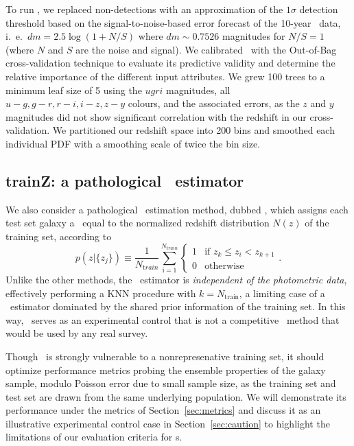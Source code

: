 To run \tpz, we replaced non-detections with an approximation of the $1\sigma$ detection threshold based on the signal-to-noise-based error forecast of the 10-year \lsst\ data, i.~e.~$dm = 2.5 \log (1 + N/S)$ where $dm \sim 0.7526$ magnitudes for $N/S = 1$ (where $N$ and $S$ are the noise and signal).
We calibrated \tpz\ with the Out-of-Bag cross-validation technique \citep{Breiman:84,Carrasco_Kind:13} to evaluate its predictive validity and determine the relative importance of the different input attributes.
We grew 100 trees to a minimum leaf size of 5 using the $ugri$ magnitudes, all $u-g, g-r, r-i, i-z, z-y$ colours, and the associated errors, as the $z$ and $y$ magnitudes did not show significant correlation with the redshift in our cross-validation.
We partitioned our redshift space into 200 bins and smoothed each individual PDF with a smoothing scale of twice the bin size.

\subsection{trainZ: a pathological \pzpdf\ estimator}
\label{sec:trainz}

We also consider a pathological \pzpdf\ estimation method, dubbed \trainz, which assigns each test set galaxy a \pzpdf\ equal to the normalized redshift distribution $N(z)$ of the training set, according to
\begin{equation}
	p(z \vert \{z_{j}\}) \equiv \frac{1}{N_{ \mathrm train}}\sum_{\mathrm i=1}^{N_{\mathrm train}} \begin{cases} 1 & \text{if\ } z_{k}\leq z_{i} < z_{k+1}\\ 0 & \text{otherwise} \end{cases}.
\end{equation}
Unlike the other methods, the \trainz\ estimator is \textit{independent of the photometric data}, effectively performing a KNN procedure with $k=N_{\mathrm{train}}$, a limiting case of a \pzpdf\ estimator dominated by the shared prior information of the training set.
In this way, \trainz\ serves as an experimental control that is not a competitive \pzpdf\ method that would be used by any real survey.

Though \trainz\ is strongly vulnerable to a nonrepresenative training set, it should optimize performance metrics probing the ensemble properties of the galaxy sample, modulo Poisson error due to small sample size, as the training set and test set are drawn from the same underlying population.
We will demonstrate its performance under the metrics of Section~\ref{sec:metrics} and discuss it as an illustrative experimental control case in Section~\ref{sec:caution} to highlight the limitations of our evaluation criteria for \pzpdf s.
